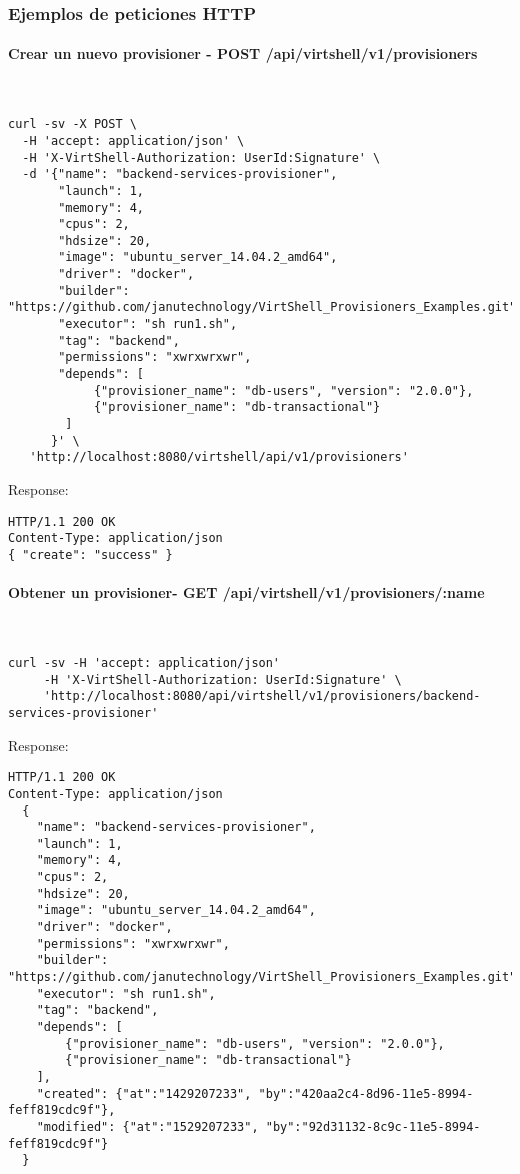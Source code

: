 \subsubsection{Ejemplos de peticiones HTTP}

\paragraph{Crear un nuevo provisioner - POST /api/virtshell/v1/provisioners} ~\\


\begin{lstlisting}[style=json]
curl -sv -X POST \
  -H 'accept: application/json' \
  -H 'X-VirtShell-Authorization: UserId:Signature' \
  -d '{"name": "backend-services-provisioner",
       "launch": 1,
       "memory": 4,
       "cpus": 2,
       "hdsize": 20,
       "image": "ubuntu_server_14.04.2_amd64",
       "driver": "docker",
       "builder": "https://github.com/janutechnology/VirtShell_Provisioners_Examples.git",
       "executor": "sh run1.sh",
       "tag": "backend",
       "permissions": "xwrxwrxwr",
       "depends": [
            {"provisioner_name": "db-users", "version": "2.0.0"},
            {"provisioner_name": "db-transactional"}
        ]
      }' \
   'http://localhost:8080/virtshell/api/v1/provisioners'
\end{lstlisting}

Response:

\begin{lstlisting}[style=json]
HTTP/1.1 200 OK
Content-Type: application/json
{ "create": "success" }
\end{lstlisting}

\paragraph{Obtener un provisioner- GET /api/virtshell/v1/provisioners/:name} ~\\

\begin{lstlisting}[style=json]
curl -sv -H 'accept: application/json' 
     -H 'X-VirtShell-Authorization: UserId:Signature' \ 
     'http://localhost:8080/api/virtshell/v1/provisioners/backend-services-provisioner'
\end{lstlisting}

Response:

\begin{lstlisting}[style=json]
HTTP/1.1 200 OK
Content-Type: application/json
  {
    "name": "backend-services-provisioner",
    "launch": 1,
    "memory": 4,
    "cpus": 2,
    "hdsize": 20,
    "image": "ubuntu_server_14.04.2_amd64",
    "driver": "docker",
    "permissions": "xwrxwrxwr",
    "builder": "https://github.com/janutechnology/VirtShell_Provisioners_Examples.git",
    "executor": "sh run1.sh",
    "tag": "backend",
    "depends": [
        {"provisioner_name": "db-users", "version": "2.0.0"},
        {"provisioner_name": "db-transactional"}
    ],
    "created": {"at":"1429207233", "by":"420aa2c4-8d96-11e5-8994-feff819cdc9f"},
    "modified": {"at":"1529207233", "by":"92d31132-8c9c-11e5-8994-feff819cdc9f"}    
  }
\end{lstlisting}


